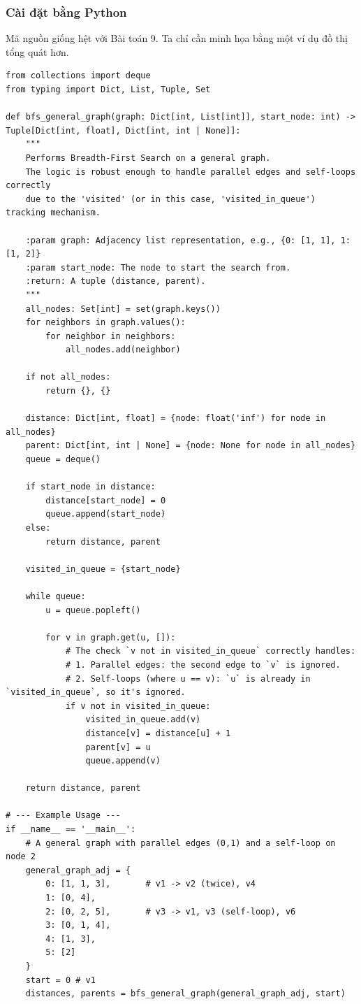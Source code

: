 \documentclass[a4paper,12pt]{article}
\begin{document}
\subsubsection{Cài đặt bằng Python}
Mã nguồn giống hệt với Bài toán 9. Ta chỉ cần minh họa bằng một ví dụ đồ thị tổng quát hơn.
\begin{lstlisting}[style=pythonstyle, caption={Cài đặt BFS cho đồ thị tổng quát trong Python.}, label={lst:python_bfs_10}]
from collections import deque
from typing import Dict, List, Tuple, Set

def bfs_general_graph(graph: Dict[int, List[int]], start_node: int) -> Tuple[Dict[int, float], Dict[int, int | None]]:
    """
    Performs Breadth-First Search on a general graph.
    The logic is robust enough to handle parallel edges and self-loops correctly
    due to the 'visited' (or in this case, 'visited_in_queue') tracking mechanism.

    :param graph: Adjacency list representation, e.g., {0: [1, 1], 1: [1, 2]}
    :param start_node: The node to start the search from.
    :return: A tuple (distance, parent).
    """
    all_nodes: Set[int] = set(graph.keys())
    for neighbors in graph.values():
        for neighbor in neighbors:
            all_nodes.add(neighbor)
    
    if not all_nodes:
        return {}, {}
        
    distance: Dict[int, float] = {node: float('inf') for node in all_nodes}
    parent: Dict[int, int | None] = {node: None for node in all_nodes}
    queue = deque()

    if start_node in distance:
        distance[start_node] = 0
        queue.append(start_node)
    else:
        return distance, parent

    visited_in_queue = {start_node}

    while queue:
        u = queue.popleft()

        for v in graph.get(u, []):
            # The check `v not in visited_in_queue` correctly handles:
            # 1. Parallel edges: the second edge to `v` is ignored.
            # 2. Self-loops (where u == v): `u` is already in `visited_in_queue`, so it's ignored.
            if v not in visited_in_queue:
                visited_in_queue.add(v)
                distance[v] = distance[u] + 1
                parent[v] = u
                queue.append(v)
                
    return distance, parent

# --- Example Usage ---
if __name__ == '__main__':
    # A general graph with parallel edges (0,1) and a self-loop on node 2
    general_graph_adj = {
        0: [1, 1, 3],       # v1 -> v2 (twice), v4
        1: [0, 4],
        2: [0, 2, 5],       # v3 -> v1, v3 (self-loop), v6
        3: [0, 1, 4],
        4: [1, 3],
        5: [2]
    }
    start = 0 # v1
    distances, parents = bfs_general_graph(general_graph_adj, start)
    

\end{lstlisting}
\end{document}
